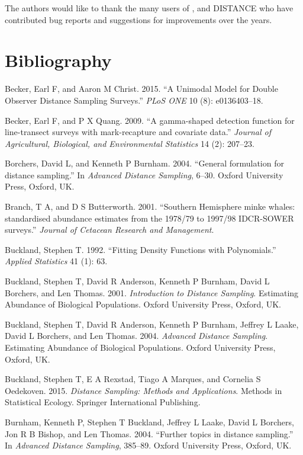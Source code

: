 \documentclass[article]{jss}
\begin{document}
The authors would like to thank the many users of ,
 and DISTANCE who have contributed bug reports and suggestions
for improvements over the years.

\section*{Bibliography}\label{bibliography}

Becker, Earl F, and Aaron M Christ. 2015. ``A Unimodal Model for Double
Observer Distance Sampling Surveys.'' \emph{PLoS ONE} 10 (8):
e0136403--18.

Becker, Earl F, and P X Quang. 2009. ``A gamma-shaped detection function
for line-transect surveys with mark-recapture and covariate data.''
\emph{Journal of Agricultural, Biological, and Environmental Statistics}
14 (2): 207--23.

Borchers, David L, and Kenneth P Burnham. 2004. ``General formulation
for distance sampling.'' In \emph{Advanced Distance Sampling}, 6--30.
Oxford University Press, Oxford, UK.

Branch, T A, and D S Butterworth. 2001. ``Southern Hemisphere minke
whales: standardised abundance estimates from the 1978/79 to 1997/98
IDCR-SOWER surveys.'' \emph{Journal of Cetacean Research and
Management}.

Buckland, Stephen T. 1992. ``Fitting Density Functions with
Polynomials.'' \emph{Applied Statistics} 41 (1): 63.

Buckland, Stephen T, David R Anderson, Kenneth P Burnham, David L
Borchers, and Len Thomas. 2001. \emph{Introduction to Distance
Sampling}. Estimating Abundance of Biological Populations. Oxford
University Press, Oxford, UK.

Buckland, Stephen T, David R Anderson, Kenneth P Burnham, Jeffrey L
Laake, David L Borchers, and Len Thomas. 2004. \emph{Advanced Distance
Sampling}. Estimating Abundance of Biological Populations. Oxford
University Press, Oxford, UK.

Buckland, Stephen T, E A Rexstad, Tiago A Marques, and Cornelia S
Oedekoven. 2015. \emph{Distance Sampling: Methods and Applications}.
Methods in Statistical Ecology. Springer International Publishing.

Burnham, Kenneth P, Stephen T Buckland, Jeffrey L Laake, David L
Borchers, Jon R B Bishop, and Len Thomas. 2004. ``Further topics in
distance sampling.'' In \emph{Advanced Distance Sampling}, 385--89.
Oxford University Press, Oxford, UK.
\end{document}
